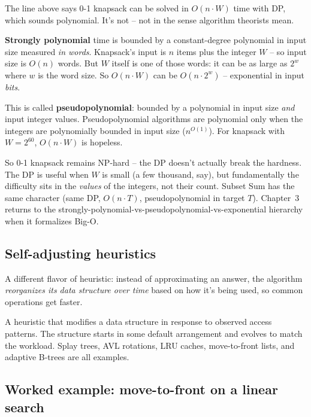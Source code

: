 \documentclass[11pt]{article}
\begin{document}
\begin{notebox}
The line above says 0-1 knapsack can be solved in $O(n \cdot W)$
time with DP, which sounds polynomial. It's not -- not in the sense
algorithm theorists mean.

\textbf{Strongly polynomial} time is bounded by a constant-degree
polynomial in input size measured \emph{in words}. Knapsack's input
is $n$ items plus the integer $W$ -- so input size is $O(n)$ words.
But $W$ itself is one of those words: it can be as large as $2^w$
where $w$ is the word size. So $O(n \cdot W)$ can be $O(n \cdot 2^w)$
-- exponential in input \emph{bits}.

This is called \textbf{pseudopolynomial}: bounded by a polynomial in
input size \emph{and} input integer values. Pseudopolynomial
algorithms are polynomial only when the integers are polynomially
bounded in input size ($n^{O(1)}$). For knapsack with $W = 2^{60}$,
$O(n \cdot W)$ is hopeless.

So 0-1 knapsack remains NP-hard -- the DP doesn't actually break
the hardness. The DP is useful when $W$ is small (a few thousand,
say), but fundamentally the difficulty sits in the \emph{values} of
the integers, not their count. Subset Sum has the same character
(same DP, $O(n \cdot T)$, pseudopolynomial in target $T$). Chapter~3
returns to the strongly-polynomial-vs-pseudopolynomial-vs-exponential
hierarchy when it formalizes Big-O.
\end{notebox}

\subsection{Self-adjusting heuristics}

A different flavor of heuristic: instead of approximating an answer,
the algorithm \emph{reorganizes its data structure over time} based
on how it's being used, so common operations get faster.

\begin{defnbox}
A heuristic that modifies a data structure in response to observed
access patterns. The structure starts in some default arrangement and
evolves to match the workload. Splay trees, AVL rotations, LRU caches,
move-to-front lists, and adaptive B-trees are all examples.
\end{defnbox}

\subsection{Worked example: move-to-front on a linear search}
\end{document}
